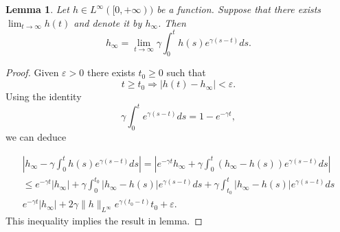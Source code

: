 \documentclass[a4paper,10pt]{article}
\newtheorem{lem}[thm]{Lemma}
\theoremstyle{remark}
\begin{document}
\begin{lem}\label{lem:lim-weak} Let $h\in L^{\infty}([0,+\infty))$ be a function. Suppose that there exists  $\lim_{t\to\infty}h(t)$ and denote it by $h_{\infty}$. Then
\begin{equation}\label{eq:lim-weak}
 h_{\infty}=\lim_{t\to\infty}\gamma\int_0^th(s)e^{\gamma (s-t)}ds.
\end{equation}
\end{lem}
\begin{proof} Given $\varepsilon>0$ there exists $t_0\geq 0$ such that 
\[
 t\geq t_0\Rightarrow |h(t)-h_{\infty}|<\varepsilon.
\]
Using the identity
\[
 \gamma\int_0^te^{\gamma (s-t)}ds=1-e^{-\gamma t},
\]
we can deduce

 \begin{multline*}
  \left|h_{\infty}-\gamma\int_0^th(s)e^{\gamma (s-t)}ds\right|=
  \left|e^{-\gamma t}h_{\infty}+ \gamma\int_0^t\left(h_{\infty}-h(s)\right)e^{\gamma (s-t)}ds \right|\\
  \leq e^{-\gamma t}|h_{\infty}|+  \gamma\int_0^{t_0} \left|h_{\infty}-h(s)\right| e^{\gamma (s-t)}ds +\gamma\int_{t_0}^{t} \left|h_{\infty}-h(s)\right| e^{\gamma (s-t)}ds\\
  e^{-\gamma t}|h_{\infty}|+2\gamma\|h\|_{L^{\infty}}e^{\gamma(t_0-t)}t_0+\varepsilon.
 \end{multline*}
This inequality implies the result in lemma.
\end{proof}
\end{document}
